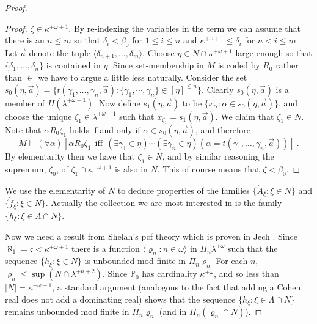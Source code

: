 \documentclass{rmmcart}
\theoremstyle{plain}
\theoremstyle{definition}
\theoremstyle{remark}
\theoremstyle{plain}
\theoremstyle{definition}
\theoremstyle{remark}
\begin{document}
\begin{proof}
\begin{proof}
              $\zeta\in \kappa^{+\omega+1}$. By
              re-indexing the variables in the term we can assume
              that there is an $n\leq m$ so that
               $\delta_i  <\beta_0$ for $1\leq i\leq n$
                and $\kappa^{+\omega+1}\leq \delta_i$ for $n<i\leq m$.
                Let $\vec a $ denote
                the tuple $\langle \delta_{n+1},\ldots, \delta_m\rangle$.
              Choose $\eta\in N\cap \kappa^{+\omega+1}$ large enough so that
             $ \{  \delta_1, \ldots, \delta_n\}$ is contained in  $\eta$. Since set-membership
             in $M$ is coded by $R_0$ rather than $\in$ we have to argue a little
             less naturally.
             Consider the set
               $s_0(\eta,\vec a) = \{ t(\gamma_1,\ldots, \gamma_n,\vec a) :
            \{\gamma_1,\cdots,\gamma_n\} \in [\eta]^{\leq n}\}$. Clearly
             $s_0(\eta,\vec a)$ is a member of $H(\lambda^{+\omega+1})$.
             Now define $s_1(\eta,\vec a) $ to be
             $\{ x_\alpha : \alpha\in s_0(\eta, \vec a)\}$,
             and choose the
             unique $\zeta_1\in \lambda^{+\omega+1}$ such
             that $x_{\zeta_1} = s_1(\eta,\vec a)$. We claim that $\zeta_1\in N$.
             Note that $\alpha R_0\zeta_1$ holds if and only if
              $ \alpha \in s_0(\eta,\vec a)$, and therefore
             $$M\models (\forall \alpha)\left[\alpha R_0 \zeta_1 ~~\mbox{iff}~~
             (\exists   \gamma_1\in \eta)\cdots(\exists \gamma_n\in\eta)(\alpha=
             t(\gamma_1,\ldots, \gamma_n,\vec a))\right]~.$$
             By elementarity then we have that $\zeta_1\in N$,
             and by similar reasoning the supremum, $\zeta_0$,
            of $\zeta_1\cap \kappa^{+\omega+1}$ is also in $N$.
               This of course means that $\zeta < \beta_0$.
            \end{proof}

            \egroup

            We use the elementarity of
             $N$  to deduce properties of the families
             $\{ \dot A_\xi : \xi\in N\}$ and $\{ \dot f_\xi : \xi \in
             N\}$.  Actually the collection we are most interested in
             is the family $\{ h_\xi : \xi\in \Lambda\cap N\}$.

            Now we need a result from Shelah's pcf theory which
            is proven in  Jech \cite[24.9]{MR1940513}.
             Since  $\aleph_1=\mathfrak c < \kappa^{+\omega+1}$ there
              is a function $\langle \varrho_n : n\in \omega\rangle$
              in $\Pi_n \lambda^{+\omega}   $ such that the sequence
               $\{ h_\xi : \xi \in N\}$ is unbounded mod finite
               in $\Pi_n \varrho_n$
               For each $n$, $\varrho_n \leq \sup(N\cap \lambda^{+n+2})$.
                  Since $\mathbb P_0$ has cardinality $\kappa^{+\omega}$,
            and so less than $|N|=\kappa^{+\omega+1}$, a standard argument
            (analogous to the fact that adding a Cohen real does
             not add a dominating real)
             shows that    the sequence $\{ h_\xi : \xi \in \Lambda\cap N\}$ remains
             unbounded
                mod finite in $\Pi_n \varrho_n$ (and in
                 $\Pi_n (\varrho_n\cap N)$).


\end{proof}
\end{document}
